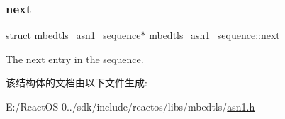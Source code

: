 \subsubsection{\texorpdfstring{next}{next}}
{\footnotesize\ttfamily \hyperlink{interfacestruct}{struct} \hyperlink{structmbedtls__asn1__sequence}{mbedtls\+\_\+asn1\+\_\+sequence}$\ast$ mbedtls\+\_\+asn1\+\_\+sequence\+::next}

The next entry in the sequence. 

该结构体的文档由以下文件生成\+:\begin{DoxyCompactItemize}
\item 
E\+:/\+React\+O\+S-\/0../sdk/include/reactos/libs/mbedtls/\hyperlink{asn1_8h}{asn1.\+h}\end{DoxyCompactItemize}
